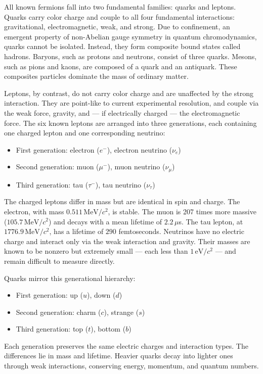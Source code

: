All known fermions fall into two fundamental families: quarks and leptons. Quarks carry color charge and couple to all four fundamental interactions: gravitational, electromagnetic, weak, and strong. Due to confinement, an emergent property of non-Abelian gauge symmetry in quantum chromodynamics, quarks cannot be isolated. Instead, they form composite bound states called hadrons. Baryons, such as protons and neutrons, consist of three quarks. Mesons, such as pions and kaons, are composed of a quark and an antiquark. These composites particles dominate the mass of ordinary matter.

Leptons, by contrast, do not carry color charge and are unaffected by the strong interaction. They are point-like to current experimental resolution, and couple via the weak force, gravity, and — if electrically charged — the electromagnetic force. The six known leptons are arranged into three generations, each containing one charged lepton and one corresponding neutrino:
\begin{itemize}
\item First generation: electron ($e^-$), electron neutrino ($\nu_e$)
\item Second generation: muon ($\mu^-$), muon neutrino ($\nu_\mu$)
\item Third generation: tau ($\tau^-$), tau neutrino ($\nu_\tau$)
\end{itemize}

The charged leptons differ in mass but are identical in spin and charge. The electron, with mass $0.511\,\text{MeV}/c^2$, is stable. The muon is 207 times more massive ($105.7\,\text{MeV}/c^2$) and decays with a mean lifetime of $2.2\,\mu$s. The tau lepton, at $1776.9\,\text{MeV}/c^2$, has a lifetime of $290$ femtoseconds. Neutrinos have no electric charge and interact only via the weak interaction and gravity. Their masses are known to be nonzero but extremely small — each less than $1\,\text{eV}/c^2$ — and remain difficult to measure directly.

Quarks mirror this generational hierarchy:
\begin{itemize}
\item First generation: up ($u$), down ($d$)
\item Second generation: charm ($c$), strange ($s$)
\item Third generation: top ($t$), bottom ($b$)
\end{itemize}
Each generation preserves the same electric charges and interaction types. The differences lie in mass and lifetime. Heavier quarks decay into lighter ones through weak interactions, conserving energy, momentum, and quantum numbers.


